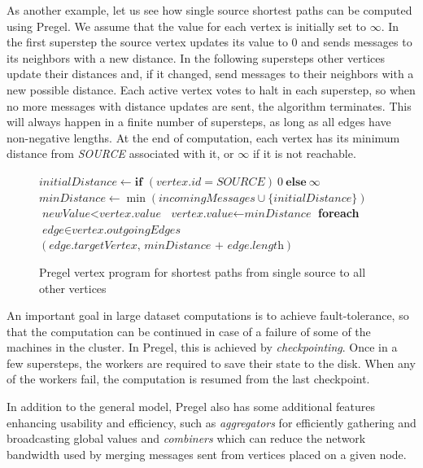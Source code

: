 As another example, let us see how single source shortest paths can be computed using Pregel. 
We assume that the value for each vertex is initially set to $\infty$.
In the first superstep the source vertex updates its value to $0$ and sends messages to its neighbors with a new distance. In the following supersteps
other vertices update their distances and, if it changed, send messages to their neighbors with a new possible distance. Each active vertex votes to halt in each superstep, so when no more messages with distance updates are sent, the algorithm terminates. This will always happen in a finite number of supersteps, as long as all edges have non-negative lengths. At the end of computation, each vertex has its minimum distance from \textit{SOURCE} associated with it, or $\infty$ if it is not reachable.

\begin{figure}[!htbp]
\begin{codebox}
  \li $\textit{initialDistance} \leftarrow \textbf{if }(vertex.id = \textit{SOURCE})~0~\textbf{else}~\infty$
  \li $\textit{minDistance} \leftarrow \min(\textit{incomingMessages} \cup \{\textit{initialDistance}\})$
  \li \If $\textit{newValue} < \textit{vertex.value}$
  \li \Then
	  $\textit{vertex.value} \leftarrow \textit{minDistance}$
  \li \textbf{foreach} $\textit{edge} \in \textit{vertex.outgoingEdges}$ \Then
  \li {}$(\textit{edge.targetVertex, minDistance + edge.length})$
  	  \End
      \End
  \li {}
\end{codebox}
\caption{Pregel vertex program for shortest paths from single source to all other vertices}
\end{figure}

An important goal in large dataset computations is to achieve fault-tolerance, so that the computation can be continued in case of a failure of some of the machines in the cluster. In Pregel, this is achieved by \emph{checkpointing}. Once in a few supersteps, the workers are required to save their state to the disk. When any of the workers fail, the computation is resumed from the last checkpoint.

In addition to the general model, Pregel also has some additional features enhancing usability and efficiency, such as \emph{aggregators} for efficiently gathering and broadcasting global values and \emph{combiners} which can reduce the network bandwidth used by merging messages sent from vertices placed on a given node.

